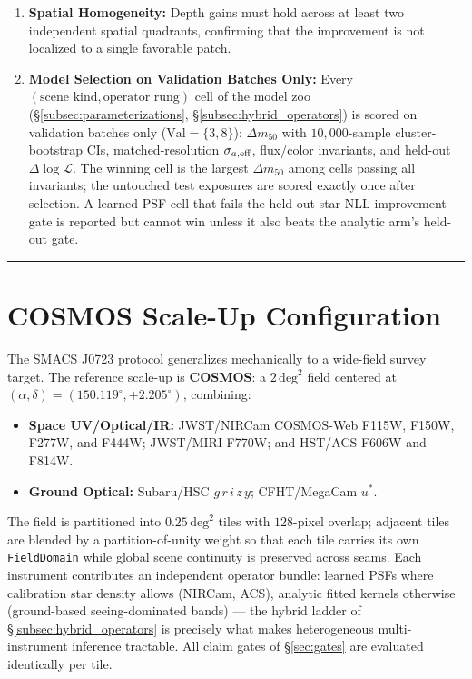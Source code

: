\documentclass[11pt,a4paper]{article}
\begin{document}
\begin{enumerate}
\begin{enumerate}
        \item \emph{Production Refit:} Only after confirmation are all exposures combined for final science products.
    \end{enumerate}
    \item \textbf{Spatial Homogeneity:}
    Depth gains must hold across at least two independent spatial quadrants, confirming that the improvement is not localized to a single favorable patch.
    \item \textbf{Model Selection on Validation Batches Only:}
    Every $(\text{scene kind}, \text{operator rung})$ cell of the model zoo (\S\ref{subsec:parameterizations}, \S\ref{subsec:hybrid_operators}) is scored on validation batches only ($\mathrm{Val} = \{3, 8\}$): $\Delta m_{50}$ with $10{,}000$-sample cluster-bootstrap CIs, matched-resolution $\sigma_{a,\rm eff}$, flux/color invariants, and held-out $\Delta\log\mathcal{L}$. The winning cell is the largest $\Delta m_{50}$ among cells passing all invariants; the untouched test exposures are scored exactly once after selection. A learned-PSF cell that fails the held-out-star NLL improvement gate is reported but cannot win unless it also beats the analytic arm's held-out gate.
\end{enumerate}

\vspace{1em}
\hrule
\vspace{1em}

\section{COSMOS Scale-Up Configuration}
\label{sec:cosmos}
The SMACS J0723 protocol generalizes mechanically to a wide-field survey target. The reference scale-up is \textbf{COSMOS}: a $2\,\mathrm{deg}^2$ field centered at $(\alpha, \delta) = (150.119^\circ, +2.205^\circ)$, combining:
\begin{itemize}
    \item \textbf{Space UV/Optical/IR:}
    JWST/NIRCam COSMOS-Web F115W, F150W, F277W, and F444W;
    JWST/MIRI F770W; and HST/ACS F606W and F814W.
    \item \textbf{Ground Optical:} Subaru/HSC $g\,r\,i\,z\,y$; CFHT/MegaCam $u^{*}$.
\end{itemize}
The field is partitioned into $0.25\,\mathrm{deg}^2$ tiles with $128$-pixel overlap; adjacent tiles are blended by a partition-of-unity weight so that each tile carries its own \texttt{FieldDomain} while global scene continuity is preserved across seams. Each instrument contributes an independent operator bundle: learned PSFs where calibration star density allows (NIRCam, ACS), analytic fitted kernels otherwise (ground-based seeing-dominated bands) --- the hybrid ladder of \S\ref{subsec:hybrid_operators} is precisely what makes heterogeneous multi-instrument inference tractable. All claim gates of \S\ref{sec:gates} are evaluated identically per tile.
\end{document}

